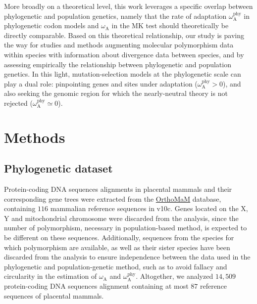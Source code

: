 \documentclass{article}
\newcommand{\rateApop}{\omega_{\mathrm{A}}}
\newcommand{\rateAphy}{\rateApop^{\mathrm{phy}}}
\begin{document}
    More broadly on a theoretical level, this work leverages a specific overlap between phylogenetic and population genetics, namely that the rate of adaptation $\rateAphy$ in phylogenetic codon models and $\rateApop$ in the MK test should theoretically be directly comparable.
    Based on this theoretical relationship, our study is paving the way for studies and methods augmenting molecular polymorphism data within species with information about divergence data between species\cite{chen_hunting_2021}, and by assessing empirically the relationship between phylogenetic and population genetics\cite{thorne_codon_2012}.
    In this light, mutation-selection models at the phylogenetic scale can play a dual role: pinpointing genes and sites under adaptation ($\rateAphy > 0$), and also seeking the genomic region for which the nearly-neutral theory is not rejected ($\rateAphy \simeq 0$).

    \section*{Methods}\label{sec:methods}

    \subsection*{Phylogenetic dataset}
    Protein-coding DNA sequences alignments in placental mammals and their corresponding gene trees were extracted from the \href{https://www.orthomam.univ-montp2.fr}{OrthoMaM} database, containing $116$ mammalian reference sequences in v10c\cite{ranwez_orthomam_2007, douzery_orthomam_2014, scornavacca_orthomam_2019}.
    Genes located on the X, Y and mitochondrial chromosome were discarded from the analysis, since the number of polymorphism, necessary in population-based method, is expected to be different on these sequences.
    Additionally, sequences from the species for which polymorphism are available, as well as their sister species have been discarded from the analysis to ensure independence between the data used in the phylogenetic and population-genetic method, such as to avoid fallacy and circularity in the estimation of $\rateApop$ and $\rateAphy$.
    Altogether, we analyzed $14,509$ protein-coding DNA sequences alignment containing at most $87$ reference sequences of placental mammals.
\end{document}
